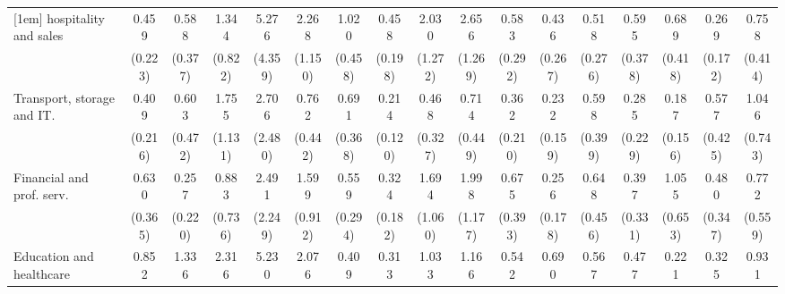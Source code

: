 {\begin{tabular}{l*{16}{c}}
[1em]
hospitality and sales&       0.459         &       0.588         &       1.344         &       5.276\sym{*}  &       2.268         &       1.020         &       0.458         &       2.030         &       2.656\sym{*}  &       0.583         &       0.436         &       0.518         &       0.595         &       0.689         &       0.269\sym{*}  &       0.758         \\
                    &     (0.223)         &     (0.377)         &     (0.822)         &     (4.359)         &     (1.150)         &     (0.458)         &     (0.198)         &     (1.272)         &     (1.269)         &     (0.292)         &     (0.267)         &     (0.276)         &     (0.378)         &     (0.418)         &     (0.172)         &     (0.414)         \\
[1em]
Transport, storage and IT.&       0.409         &       0.603         &       1.755         &       2.706         &       0.762         &       0.691         &       0.214\sym{**} &       0.468         &       0.714         &       0.362         &       0.232\sym{*}  &       0.598         &       0.285         &       0.187\sym{*}  &       0.577         &       1.046         \\
                    &     (0.216)         &     (0.472)         &     (1.131)         &     (2.480)         &     (0.442)         &     (0.368)         &     (0.120)         &     (0.327)         &     (0.449)         &     (0.210)         &     (0.159)         &     (0.399)         &     (0.229)         &     (0.156)         &     (0.425)         &     (0.743)         \\
[1em]
Financial and prof. serv.&       0.630         &       0.257         &       0.883         &       2.491         &       1.599         &       0.559         &       0.324\sym{*}  &       1.694         &       1.998         &       0.675         &       0.256         &       0.648         &       0.397         &       1.055         &       0.480         &       0.772         \\
                    &     (0.365)         &     (0.220)         &     (0.736)         &     (2.249)         &     (0.912)         &     (0.294)         &     (0.182)         &     (1.060)         &     (1.177)         &     (0.393)         &     (0.178)         &     (0.456)         &     (0.331)         &     (0.653)         &     (0.347)         &     (0.559)         \\
[1em]
Education and healthcare&       0.852         &       1.336         &       2.316         &       5.230         &       2.076         &       0.409         &       0.313\sym{*}  &       1.033         &       1.166         &       0.542         &       0.690         &       0.567         &       0.477         &       0.221\sym{*}  &       0.325         &       0.931         \\

\end{tabular}}
